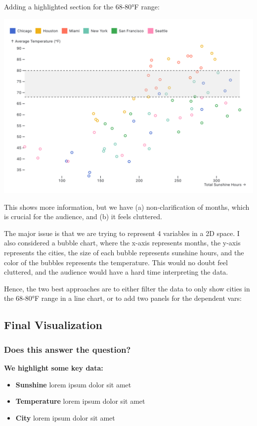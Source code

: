 \documentclass{article}
\begin{document}
\pagebreak

Adding a highlighted section for the 68-80°F range:

\begin{center}
    \includegraphics[scale=0.2]{scatter2.png}
\end{center}

This shows more information, but we have (a) non-clarification of months, which is crucial for the audience, and (b) it feels cluttered.

The major issue is that we are trying to represent 4 variables in a 2D space.
I also considered a bubble chart, where the x-axis represents months, 
the y-axis represents the cities, 
the size of each bubble represents sunshine hours, 
and the color of the bubbles represents the temperature.
This would no doubt feel cluttered, and the audience would have a hard time 
interpreting the data.

Hence, the two best approaches are to either filter the data to only 
show cities in the 68-80°F range in a line chart,
or to add two panels for the dependent vars:




\subsection{Final Visualization}
\subsubsection{Does this answer the question?}

\textbf{We highlight some key data:}
\begin{itemize}
    \item \textbf{Sunshine} lorem ipsum dolor sit amet  
    \item \textbf{Temperature} lorem ipsum dolor sit amet
    \item \textbf{City} lorem ipsum dolor sit amet
\end{itemize}
\end{document}
